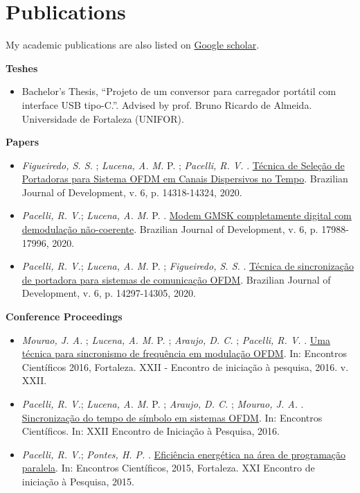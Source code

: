 \section{Publications}
My academic publications are also listed on \href{https://scholar.google.com.br/citations?user=Kj6Gzs4AAAAJ&hl=pt-BR&oi=sra}{Google scholar}.

\textbf{Teshes}
\begin{itemize}[label={-}]
    \item Bachelor's Thesis, ``Projeto de um conversor para carregador portátil com interface USB tipo-C.''. Advised by prof. Bruno Ricardo de Almeida. Universidade de Fortaleza (UNIFOR).
\end{itemize}

\textbf{Papers}
\begin{itemize}[label={-}]
    \item \textit{Figueiredo, S. S.} ; \textit{Lucena, A. M.} P. ; \textit{Pacelli, R. V.} . \href{https://www.brazilianjournals.com/index.php/BRJD/article/view/7946/6889}{Técnica de Seleção de Portadoras para Sistema OFDM em Canais Dispersivos no Tempo}. Brazilian Journal of Development, v. 6, p. 14318-14324, 2020.
    \item \textit{Pacelli, R. V.}; \textit{Lucena, A. M.} P. . \href{https://www.brazilianjournals.com/index.php/BRJD/article/view/8538/7345}{Modem GMSK completamente digital com demodulação não-coerente}. Brazilian Journal of Development, v. 6, p. 17988-17996, 2020.
    \item \textit{Pacelli, R. V.}; \textit{Lucena, A. M.} P. ; \textit{Figueiredo, S. S.} . \href{https://www.brazilianjournals.com/index.php/BRJD/article/view/7944/6883}{Técnica de sincronização de portadora para sistemas de comunicação OFDM}. Brazilian Journal of Development, v. 6, p. 14297-14305, 2020.
\end{itemize}

\textbf{Conference Proceedings}
\begin{itemize}[label={-}]
    \item \textit{Mourao, J. A.} ; \textit{Lucena, A. M.} P. ; \textit{Araujo, D. C.} ; \textit{Pacelli, R. V.} . \href{https://uol.unifor.br/oul/conteudosite/?cdConteudo=6946081}{Uma técnica para sincronismo de frequência em modulação OFDM}. In: Encontros Científicos 2016, Fortaleza. XXII - Encontro de iniciação à pesquisa, 2016. v. XXII.
    \item \textit{Pacelli, R. V.}; \textit{Lucena, A. M.} P. ; \textit{Araujo, D. C.} ; \textit{Mourao, J. A.} . \href{https://uol.unifor.br/oul/conteudosite/?cdConteudo=6949723}{Sincronização do tempo de símbolo em sistemas OFDM}. In: Encontros Científicos. In: XXII Encontro de Iniciação à Pesquisa, 2016.
    \item \textit{Pacelli, R. V.}; \textit{Pontes, H. P.} . \href{https://uol.unifor.br/oul/conteudosite/?cdConteudo=6111841}{Eficiência energética na área de programação paralela}. In: Encontros Científicos, 2015, Fortaleza. XXI Encontro de iniciação à Pesquisa, 2015.
\end{itemize}